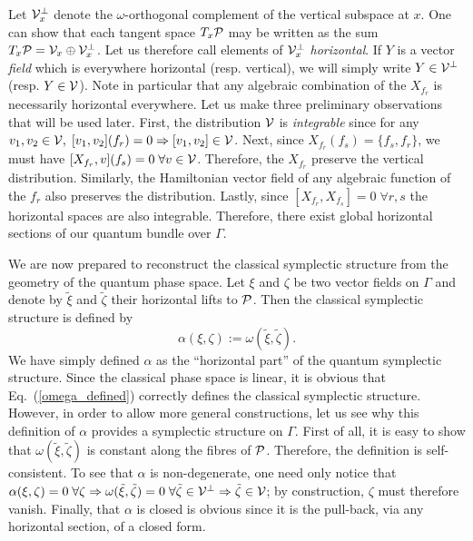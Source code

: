 \documentclass[12pt,aps,eqsecnum,tighten]{revtex4-2}
\def\be{\begin{equation}}
\def\ee{\end{equation}}
\def\a{\alpha}
\def\P{{\cal P}}
\def\w{\omega}
\def\implies{\Rightarrow}
\newcommand{\eqn}[1]{Eq.~(\ref{#1})}
\newcommand{\hvf}[1]{{X_{#1}}}
\begin{document}
Let ${\cal V}_x^\perp$ denote the $\w$-orthogonal complement of the
vertical subspace at $x$.  One can show \cite{thesis} that each
tangent space $T_x\P$ may be written as the sum $T_x\P = {\cal V}_x
\oplus {\cal V}_x^\perp$.  Let us therefore call elements of ${\cal
V}_x^\perp$ {\em horizontal}.  If $Y$ is a vector {\em field} which is
everywhere horizontal (resp. vertical), we will simply write $Y \in
{\cal V}^\perp$ (resp. $Y \in {\cal V}$).  Note in particular that any
algebraic combination of the $\hvf{f_r}$ is necessarily horizontal
everywhere.  Let us make three preliminary observations that will be
used later.  First, the distribution ${\cal V}$ is {\em integrable}
since for any $v_1, v_2 \in {\cal V}, \; [v_1, v_2](f_r)=0 \implies
[v_1, v_2] \in {\cal V}$.  Next, since $\hvf{f_r}(f_s) = \{f_s,
f_r\}$, we must have $[\hvf{f_r}, v](f_s) = 0 \; \forall v\in{\cal
V}$.  Therefore, the $\hvf{f_r}$ preserve the vertical distribution.
Similarly, the Hamiltonian vector field of any algebraic function of
the $f_r$ also preserves the distribution.  Lastly, since $[\hvf{f_r},
\hvf{f_s}] = 0 \; \forall r,s$ the horizontal spaces are also
integrable.  Therefore, there exist global horizontal sections of our
quantum bundle over $\Gamma$.

We are now prepared to reconstruct the classical symplectic structure
from the geometry of the quantum phase space.  Let $\xi$ and $\zeta$
be two vector fields on $\Gamma$ and denote by $\tilde{\xi}$ and
$\tilde{\zeta}$ their horizontal lifts to $\P$.  Then the classical
symplectic structure is defined by \be \label{omega_defined} \a(\xi,
\zeta) := \w(\tilde{\xi}, \tilde{\zeta}).  \ee We have simply defined
$\a$ as the ``horizontal part'' of the quantum symplectic structure.
Since the classical phase space is linear, it is obvious that
\eqn{omega_defined} correctly defines the classical symplectic
structure.  However, in order to allow more general constructions, let
us see why this definition of $\a$ provides a symplectic structure on
$\Gamma$.  First of all, it is easy to show that $\w(\tilde{\xi},
\tilde{\zeta})$ is constant along the fibres of $\P$.  Therefore, the
definition is self-consistent.  To see that $\a$ is non-degenerate,
one need only notice that $\a(\xi, \zeta)=0 \; \forall \zeta \implies
\w(\tilde{\xi}, \tilde{\zeta}) = 0 \; \forall \tilde{\zeta} \in {\cal
V}^\perp \implies \tilde{\zeta} \in {\cal V}$; by construction,
$\zeta$ must therefore vanish.  Finally, that $\a$ is closed is
obvious since it is the pull-back, via any horizontal section, of a
closed form.
\end{document}
